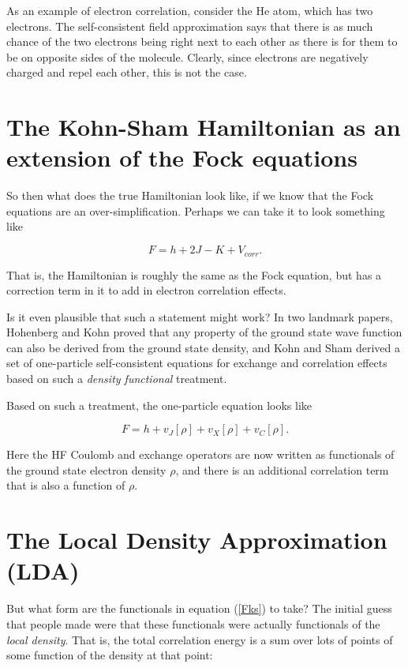 As an example of electron correlation, consider the He atom, which has
two electrons. The self-consistent field approximation says that there
is as much chance of the two electrons being right next to each other
as there is for them to be on opposite sides of the molecule. Clearly,
since electrons are negatively charged and repel each other, this is
not the case.

\section{The Kohn-Sham Hamiltonian as an extension of the Fock
equations}
So then what does the true Hamiltonian look like, if we know that the
Fock equations are an over-simplification. Perhaps we can take it to
look something like

\begin{equation}
F = h + 2J - K + V_{corr}.
\end{equation}

\noindent That is, the Hamiltonian is roughly the same as the Fock
equation, but has a correction term in it to add in electron
correlation effects.

Is it even plausible that such a statement might work? In two landmark
papers, Hohenberg and Kohn proved that any property
of the ground state wave function can also be derived from the ground
state density, and Kohn and Sham derived a set of
one-particle self-consistent equations for exchange and correlation
effects based on such a \emph{density functional} treatment.

Based on such a treatment, the one-particle equation looks like 

\begin{equation}
F = h + v_J[\rho] + v_X[\rho] + v_C[\rho].
\label{Fks}
\end{equation}

\noindent Here the HF Coulomb and exchange operators are now written
as functionals of the ground state electron density $\rho$, and there
is an additional correlation term that is also a function of $\rho$.

\section{The Local Density Approximation (LDA)}
But what form are the functionals in equation (\ref{Fks}) to take? The
initial guess that people made were that these functionals were
actually functionals of the \emph{local density}. That is, the total
correlation energy is a sum over lots of points of some function of
the density at that point:

